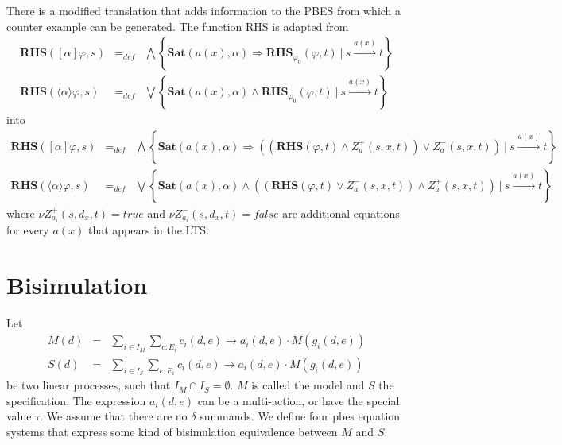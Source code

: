 \documentclass{article}
\begin{document}
There is a modified translation that adds information to the PBES from which
a counter example can be generated. The function RHS is adapted from%
\begin{equation*}
\begin{array}{lll}
{\mathbf{RHS}}([\alpha ]\varphi ,s) & =_{def} & \bigwedge
\left\{ \mathbf{Sat}(a(x),\alpha )\Rightarrow {\mathbf{RHS}}_{\varphi
_{0}}(\varphi ,t)\ |\ s\overset{a(x)}{\rightarrow }t\right\}  \\
{\mathbf{RHS}}(\langle \alpha \rangle \varphi ,s) & =_{def} &
\bigvee \left\{ \mathbf{Sat}(a(x),\alpha )\wedge {\mathbf{RHS}}_{\varphi
_{0}}(\varphi ,t)\ |\ s\overset{a(x)}{\rightarrow }t\right\}
\end{array}%
\end{equation*}%
into%
\begin{equation*}
\begin{array}{lll}
{\mathbf{RHS}}([\alpha ]\varphi ,s) & =_{def} & \bigwedge
\left\{ \mathbf{Sat}(a(x),\alpha )\Rightarrow \left( \left( {\mathbf{RHS}}%
(\varphi ,t)\wedge Z_{a}^{+}(s,x,t)\right) \vee
Z_{a}^{-}(s,x,t)\right) \ |\ s\overset{a(x)}{\rightarrow }t\right\}  \\
{\mathbf{RHS}}(\langle \alpha \rangle \varphi ,s) & =_{def} &
\bigvee \left\{ \mathbf{Sat}(a(x),\alpha )\wedge \left( \left( {\mathbf{RHS}}%
(\varphi ,t)\vee Z_{a}^{-}(s,x,t)\right) \wedge
Z_{a}^{+}(s,x,t)\right) \ |\ s\overset{a(x)}{\rightarrow }t\right\}
\end{array}%
\end{equation*}%
where $\nu Z_{a_{i}}^{+}(s,d_{x},t)=true$ and $\nu
Z_{a_{i}}^{-}(s,d_{x},t)=false$ are additional equations for every $a(x)$
that appears in the LTS.

\newpage
\section{Bisimulation}

Let%
\begin{eqnarray*}
M(d) &=&\sum\limits_{i\in I_{M}}\sum_{e:E_{i}}c_{i}(d,e)\rightarrow
a_{i}(d,e)\cdot M(g_{i}(d,e)) \\
S(d) &=&\sum\limits_{i\in I_{S}}\sum_{e:E_{i}}c_{i}(d,e)\rightarrow
a_{i}(d,e)\cdot M(g_{i}(d,e))
\end{eqnarray*}%
be two linear processes, such that $I_{M}\cap I_{S}=\emptyset $. $M$ is
called the model and $S$ the specification. The expression $a_{i}(d,e)$ can
be a multi-action, or have the special value $\tau $. We assume that there
are no $\delta $ summands. We define four pbes equation systems that express
some kind of bisimulation equivalence between $M$ and $S$.
\end{document}
